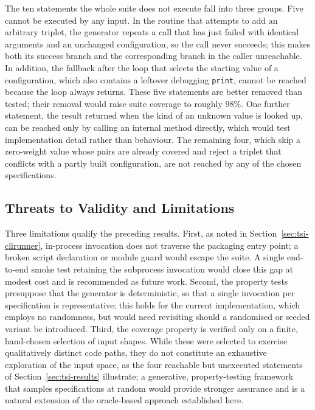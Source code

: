 \documentclass[
  digital, %
  oneside, %
  lof,     %
  nolot,     %
]{fithesis4}
\begin{document}
The ten statements the whole suite does not execute fall into three groups.
Five cannot be executed by any input. In the routine that attempts to add an
arbitrary triplet, the generator repeats a call that has just failed with
identical arguments and an unchanged configuration, so the call never succeeds;
this makes both its success branch and the corresponding branch in the caller
unreachable. In addition, the fallback after the loop that selects the starting
value of a configuration, which also contains a leftover debugging
\texttt{print}, cannot be reached because the loop always returns. These five
statements are better removed than tested; their removal would raise suite
coverage to roughly $98\%$. One further statement, the result returned when the
kind of an unknown value is looked up, can be reached only by calling an
internal method directly, which would test implementation detail rather than
behaviour. The remaining four, which skip a zero-weight value whose pairs are
already covered and reject a triplet that conflicts with a partly built
configuration, are not reached by any of the chosen specifications.

\subsection{Threats to Validity and Limitations}
\label{sec:tsi-validity}

Three limitations qualify the preceding results. First, as noted in
Section~\ref{sec:tsi-clirunner}, in-process invocation does not traverse the
packaging entry point; a broken script declaration or module guard would escape
the suite. A single end-to-end smoke test retaining the subprocess invocation
would close this gap at modest cost and is recommended as future work. Second,
the property tests presuppose that the generator is deterministic, so that a
single invocation per specification is representative; this holds for the current
implementation, which employs no randomness, but would need revisiting should a
randomised or seeded variant be introduced. Third, the coverage property is
verified only on a finite, hand-chosen selection of input shapes. While these
were selected to exercise qualitatively distinct code paths, they do not
constitute an exhaustive exploration of the input space, as the four reachable
but unexecuted statements of Section~\ref{sec:tsi-results} illustrate; a generative,
property-testing framework that samples specifications at random would provide
stronger assurance and is a natural extension of the oracle-based approach
established here.
\end{document}
